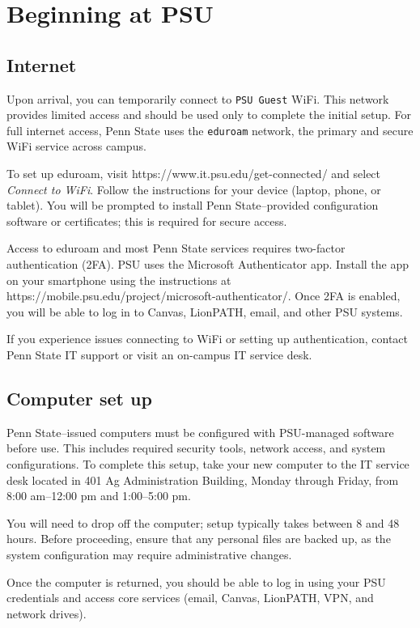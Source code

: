 \documentclass[11pt, oneside]{article}   	%
\begin{document}
\section{Beginning at PSU}

\subsection{Internet}
Upon arrival, you can temporarily connect to \texttt{PSU Guest} WiFi. This network provides limited access and should be used only to complete the initial setup. For full internet access, Penn State uses the \texttt{eduroam} network, the primary and secure WiFi service across campus.

To set up eduroam, visit https://www.it.psu.edu/get-connected/ and select \textit{Connect to WiFi}. Follow the instructions for your device (laptop, phone, or tablet). You will be prompted to install Penn State–provided configuration software or certificates; this is required for secure access.

Access to eduroam and most Penn State services requires two-factor authentication (2FA). PSU uses the Microsoft Authenticator app. Install the app on your smartphone using the instructions at https://mobile.psu.edu/project/microsoft-authenticator/. Once 2FA is enabled, you will be able to log in to Canvas, LionPATH, email, and other PSU systems.

If you experience issues connecting to WiFi or setting up authentication, contact Penn State IT support or visit an on-campus IT service desk.

\subsection{Computer set up}
Penn State–issued computers must be configured with PSU-managed software before use. This includes required security tools, network access, and system configurations. To complete this setup, take your new computer to the IT service desk located in 401 Ag Administration Building, Monday through Friday, from 8:00 am–12:00 pm and 1:00–5:00 pm.

You will need to drop off the computer; setup typically takes between 8 and 48 hours. Before proceeding, ensure that any personal files are backed up, as the system configuration may require administrative changes.

Once the computer is returned, you should be able to log in using your PSU credentials and access core services (email, Canvas, LionPATH, VPN, and network drives).
\end{document}
